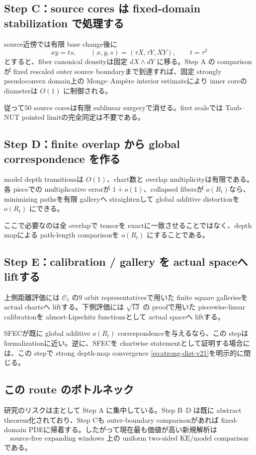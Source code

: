 \documentclass[11pt,a4paper]{ltjsarticle}
\newcommand{\cC}{\mathcal C}
\theoremstyle{plain}
\theoremstyle{definition}
\theoremstyle{remark}
\begin{document}
\subsection{Step C：source cores は fixed-domain stabilization で処理する}
source近傍では有限 base change後に
\[
 xy=ts,\qquad (x,y,s)=(\tau X,\tau Y,XY),\qquad t=\tau^2
\]
とすると、fiber canonical densityは固定 $dX\wedge dY$ に移る。Step A の comparisonが fixed rescaled outer source boundaryまで到達すれば、固定 strongly pseudoconvex domain上の Monge--Ampère interior estimateにより inner coreの diameterは $O(1)$ に制御される。

従って50 source coresは有限 sublinear surgeryで消せる。first scaleでは Taub--NUT pointed limitの完全同定は不要である。

\subsection{Step D：finite overlap から global correspondence を作る}
model depth transitionsは $O(1)$、chart数と overlap multiplicityは有限である。各 pieceでの multiplicative errorが $1+o(1)$、collapsed fibersが $o(R_t)$なら、minimizing pathsを有限 galleryへ straightenして global additive distortionを $o(R_t)$ にできる。

ここで必要なのは全 overlapで tensorを exactに一致させることではなく、depth mapによる path-length comparisonを $o(R_t)$ にすることである。

\subsection{Step E：calibration / gallery を actual spaceへ liftする}
上側距離評価には $\cC_5$ の9 orbit representativesで用いた finite square galleriesを actual chartsへ liftする。下側評価には $\sqrt{13}$ の proofで用いた piecewise-linear calibrationを almost-Lipschitz functionsとして actual spaceへ liftする。

SFECが既に global additive $o(R_t)$ correspondenceを与えるなら、この stepは formalizationに近い。逆に、SFECを chartwise statementとして証明する場合には、この stepで strong depth-map convergence \eqref{eq:strong-dist-v21}を明示的に閉じる。

\subsection{この route のボトルネック}
研究のリスクは主として Step A に集中している。Step B--D は既に abstract theorem化されており、Step Cも outer-boundary comparisonがあれば fixed-domain PDEに帰着する。したがって現在最も価値が高い新規解析は
\[
 \boxed{\text{source-free expanding windows 上の uniform two-sided KE/model comparison}}
\]
である。
\end{document}
